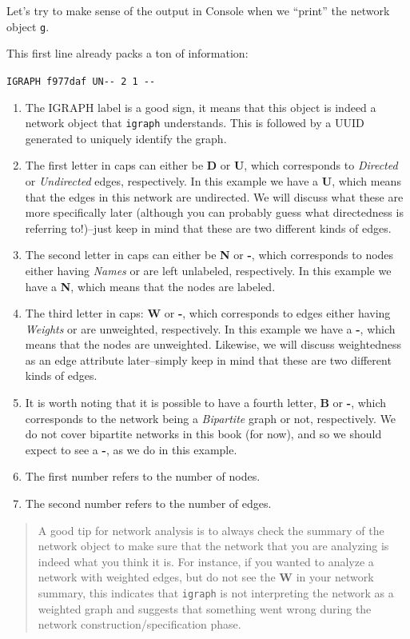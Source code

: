 \documentclass[
]{book}
\providecommand{\tightlist}{%
  \setlength{\itemsep}{0pt}\setlength{\parskip}{0pt}}
\begin{document}
Let's try to make sense of the output in Console when we ``print'' the network object \texttt{g}.

This first line already packs a ton of information:

\texttt{IGRAPH\ f977daf\ UN-\/-\ 2\ 1\ -\/-}

\begin{enumerate}
\def\labelenumi{\arabic{enumi}.}
\tightlist
\item
  The IGRAPH label is a good sign, it means that this object is indeed a network object that \texttt{igraph} understands. This is followed by a UUID generated to uniquely identify the graph.
\item
  The first letter in caps can either be \textbf{D} or \textbf{U}, which corresponds to \emph{Directed} or \emph{Undirected} edges, respectively. In this example we have a \textbf{U}, which means that the edges in this network are undirected. We will discuss what these are more specifically later (although you can probably guess what directedness is referring to!)--just keep in mind that these are two different kinds of edges.\\
\item
  The second letter in caps can either be \textbf{N} or \textbf{-}, which corresponds to nodes either having \emph{Names} or are left unlabeled, respectively. In this example we have a \textbf{N}, which means that the nodes are labeled.
\item
  The third letter in caps: \textbf{W} or \textbf{-}, which corresponds to edges either having \emph{Weights} or are unweighted, respectively. In this example we have a \textbf{-}, which means that the nodes are unweighted. Likewise, we will discuss weightedness as an edge attribute later--simply keep in mind that these are two different kinds of edges.
\item
  It is worth noting that it is possible to have a fourth letter, \textbf{B} or \textbf{-}, which corresponds to the network being a \emph{Bipartite} graph or not, respectively. We do not cover bipartite networks in this book (for now), and so we should expect to see a \textbf{-}, as we do in this example.
\item
  The first number refers to the number of nodes.
\item
  The second number refers to the number of edges.
\end{enumerate}

\begin{quote}
A good tip for network analysis is to always check the summary of the network object to make sure that the network that you are analyzing is indeed what you think it is. For instance, if you wanted to analyze a network with weighted edges, but do not see the \textbf{W} in your network summary, this indicates that \texttt{igraph} is not interpreting the network as a weighted graph and suggests that something went wrong during the network construction/specification phase.
\end{quote}
\end{document}

